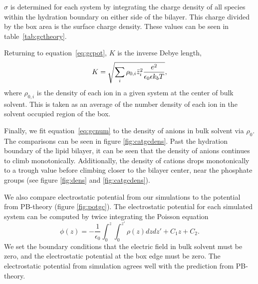 \documentclass[journal=langd5,manuscript=article]{achemso}
\begin{document}
$\sigma$ is determined for
each system by integrating the charge density of all species within the hydration boundary on either side of the bilayer.
This charge divided by the box area is the surface charge density.
These values can be seen in table~\ref{tab:gctheory}. 

Returning to equation~\ref{eq:gcpot}, $K$ is the inverse Debye length,
\begin{equation}
K=\sqrt{\sum_{i} \rho_{0,i} \bar z_i^2\frac{\text{\si{\elementarycharge}}^2}{\epsilon_0 \epsilon k_bT}},
\label{eq:debyelength}
\end{equation}
where $\rho_{0,i}$ is the density of each ion in a given system at the center of bulk solvent.
This is taken as an average of the number density of each ion in the solvent occupied region of the box.

Finally, we fit equation~\ref{eq:gcnum} to the density of anions in 
bulk solvent via $\rho_0$. The comparisons
can be seen in figure \ref{fig:catgcdens}.
Past the hydration boundary of the lipid bilayer, it can be seen that the density of anions continues 
to climb monotonically. Additionally, the density of cations 
drops monotonically to a trough value before climbing closer to the bilayer center, near the phosphate groups 
(see figure \ref{fig:dens} and \ref{fig:catgcdens}). 


We also compare  
electrostatic potential from our simulations 
to the potential from PB-theory 
(figure \ref{fig:potgc}). 
The electrostatic potential for each simulated system can be computed 
by twice integrating the Poisson equation 
\begin{equation}
    \phi(z)=-\frac{1}{\epsilon_0}\int_{0}^{z}\int_{0}^{z'}\rho(z) dz dz' + C_1z + C_2\text{.}
    \label{eq:poissonint}
\end{equation}
We set the boundary conditions that
the electric field in bulk solvent must be zero, and the electrostatic potential at the box edge must be zero.
The electrostatic potential from simulation agrees well with the prediction from PB-theory.
\end{document}
